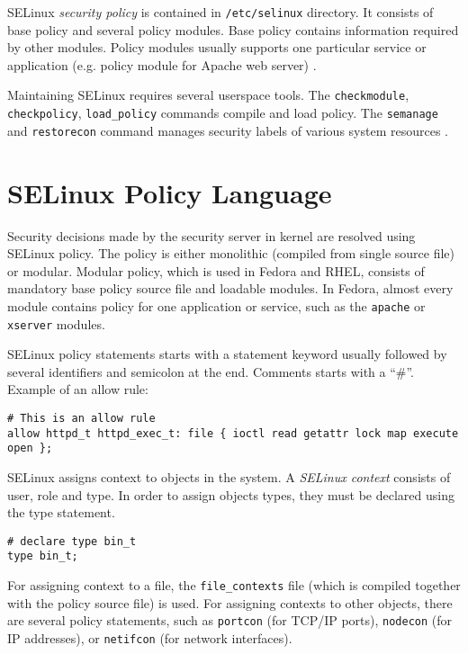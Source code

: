 SELinux \emph{security policy} is contained in \texttt{/etc/selinux} directory.
It consists of base policy and several policy modules. Base policy contains
information required by other modules. Policy modules usually supports one
particular service or application (e.g. policy module for Apache web server)
\cite[pp.~20--22]{tsn}.

Maintaining SELinux requires several userspace tools. The \texttt{checkmodule},
\texttt{checkpolicy}, \texttt{load\_policy} commands compile and load policy.
The \texttt{semanage} and \texttt{restorecon} command manages security labels of
various system resources \cite[p.~389]{tsn}.

\section{SELinux Policy Language}
Security decisions made by the security server in kernel are resolved using
SELinux policy. The policy is either monolithic (compiled from single source
file) or modular. Modular policy, which is used in Fedora and RHEL, consists of
mandatory base policy source file and loadable modules. In Fedora, almost every
module contains policy for one application or service, such as the
\texttt{apache} or \texttt{xserver} modules.

SELinux policy statements starts with a statement keyword usually followed by
several identifiers and semicolon at the end. Comments starts with a ``\#''.
Example of an allow rule:

\begin{lstlisting}
# This is an allow rule
allow httpd_t httpd_exec_t: file { ioctl read getattr lock map execute open };
\end{lstlisting}

SELinux assigns context to objects in the system. A \emph{SELinux context}
consists of user, role and type. In order to assign objects types, they must be
declared using the type statement.

\begin{lstlisting}
# declare type bin_t
type bin_t;
\end{lstlisting}

For assigning context to a file, the \texttt{file\_contexts} file (which is
compiled together with the policy source file) is used. For assigning contexts
to other objects, there are several policy statements, such as \texttt{portcon}
(for TCP/IP ports), \texttt{nodecon} (for IP addresses), or \texttt{netifcon}
(for network interfaces).

